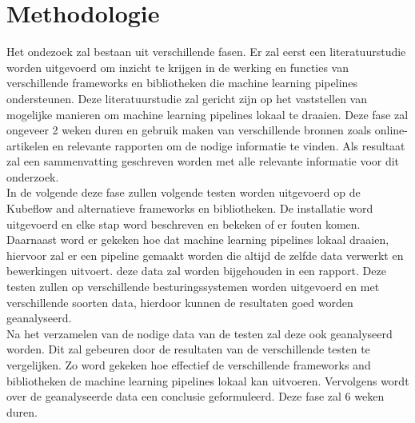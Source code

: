 

\section{Methodologie}%
\label{sec:methodologie}

Het ondezoek zal bestaan uit verschillende fasen. Er zal eerst een literatuurstudie worden uitgevoerd om inzicht te krijgen in de werking en
functies van verschillende frameworks en bibliotheken die machine learning pipelines ondersteunen.
Deze literatuurstudie zal gericht zijn op het vaststellen van mogelijke manieren om machine learning pipelines lokaal te draaien. Deze fase zal ongeveer 2 weken duren en gebruik maken van verschillende bronnen zoals online-artikelen en relevante rapporten om de nodige informatie te vinden. Als resultaat zal een sammenvatting geschreven worden met alle relevante informatie voor dit onderzoek.\\

In de volgende deze fase zullen volgende testen worden uitgevoerd op de Kubeflow and alternatieve frameworks en bibliotheken. De installatie word uitgevoerd en elke stap word beschreven en bekeken of er fouten komen. Daarnaast word er gekeken hoe dat machine learning pipelines lokaal draaien, hiervoor zal er een pipeline gemaakt worden die altijd de zelfde data verwerkt en bewerkingen uitvoert. deze data zal worden bijgehouden in een rapport.
Deze testen zullen op verschillende besturingssystemen worden uitgevoerd en met verschillende soorten data, hierdoor kunnen de resultaten goed worden geanalyseerd.\\

Na het verzamelen van de nodige data van de testen zal deze ook geanalyseerd worden. Dit zal gebeuren door de resultaten van de verschillende testen te vergelijken. Zo word gekeken hoe effectief de verschillende frameworks and bibliotheken de machine learning pipelines lokaal kan uitvoeren. Vervolgens wordt over de geanalyseerde data een conclusie geformuleerd.
Deze fase zal 6 weken duren.\\

